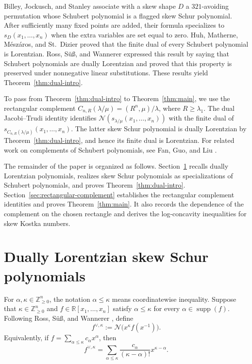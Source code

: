 \documentclass[11pt]{article}
\theoremstyle{definition}
\newcommand{\Nop}{\mathcal N}
\newcommand{\R}{\mathbb R}
\newcommand{\Znonneg}{\mathbb Z_{\ge0}}
\newcommand{\supp}{\operatorname{supp}}
\begin{document}
Billey, Jockusch, and Stanley
\cite[Proposition~2.2, Theorem~2.2, and the proof of
Corollary~2.4]{BJS} associate with a skew shape $D$ a
$321$-avoiding permutation whose Schubert polynomial is a flagged skew Schur
polynomial.  After sufficiently many fixed points are added, their formula
specializes to $s_D(x_1,\ldots,x_n)$ when the extra variables are set equal
to zero.  Huh, Matherne,
M\'esz\'aros, and St.~Dizier \cite[Theorem~6]{HMMSD} proved that the finite
dual of every Schubert polynomial is Lorentzian.  Ross, S\"u\ss, and Wannerer
\cite[Theorems~4.5 and~5.12]{RSW} expressed this result by saying that
Schubert polynomials are dually Lorentzian and proved that this property is
preserved under nonnegative linear substitutions.  These results yield
Theorem~\ref{thm:dual-intro}.

To pass from Theorem~\ref{thm:dual-intro} to Theorem~\ref{thm:main}, we use
the rectangular complement
$C_{n,R}(\lambda/\mu)=(R^n,\mu)/\lambda$, where $R\ge\lambda_1$.  The dual
Jacobi--Trudi identity identifies
$\Nop(s_{\lambda/\mu}(x_1,\ldots,x_n))$ with the finite dual of
$s_{C_{n,R}(\lambda/\mu)}(x_1,\ldots,x_n)$.  The latter skew Schur polynomial
is dually Lorentzian by Theorem~\ref{thm:dual-intro}, and hence its finite
dual is Lorentzian.  For related work on complements of Schubert polynomials,
see Fan, Guo, and Liu \cite{FGL}.

The remainder of the paper is organized as follows.
Section~\ref{sec:dually-lorentzian} recalls dually Lorentzian polynomials,
realizes skew Schur polynomials as specializations of Schubert polynomials,
and proves Theorem~\ref{thm:dual-intro}.
Section~\ref{sec:rectangular-complement} establishes the rectangular
complement identities and proves Theorem~\ref{thm:main}.  It also records the
dependence of the complement on the chosen rectangle and derives the
log-concavity inequalities for skew Kostka numbers.

\section{Dually Lorentzian skew Schur polynomials}
\label{sec:dually-lorentzian}

For $\alpha,\kappa\in\Znonneg^n$, the notation $\alpha\le\kappa$ means
coordinatewise inequality.  Suppose that $\kappa\in\Znonneg^n$ and
$f\in\R[x_1,\ldots,x_n]$ satisfy $\alpha\le\kappa$ for every
$\alpha\in\supp(f)$.  Following Ross, S\"u\ss, and Wannerer
\cite[Definition~4.2 and Remark~4.3]{RSW}, define
\begin{equation}\label{eq:dual-definition}
  f^{\vee,\kappa}
  :=\Nop\bigl(x^\kappa f(x^{-1})\bigr).
\end{equation}
Equivalently, if $f=\sum_{\alpha\le\kappa}c_\alpha x^\alpha$, then
\[
  f^{\vee,\kappa}
  =\sum_{\alpha\le\kappa}
   \frac{c_\alpha}{(\kappa-\alpha)!}x^{\kappa-\alpha}.
\]
\end{document}
